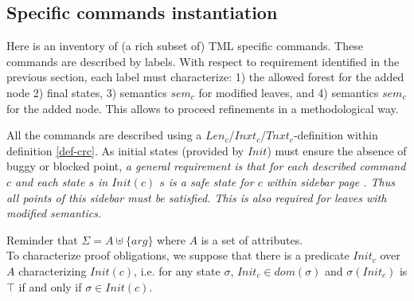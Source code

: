 \documentclass{article}
\begin{document}
\subsection{Specific commands instantiation}
Here is an inventory of (a rich subset of) TML specific commands. These commands are described by labels. With respect to requirement identified in the previous section, each label must characterize: 1) the allowed forest for the added node 2) final states, 3) semantics $sem_c$ for modified leaves, and 4) semantics $sem_c$ for the added node. This allows to proceed refinements in a methodological way.

All the commands are described using a $Len_c$/$Inxt_c$/$T\!nxt_c$-definition within definition \ref{def-crc}. As initial states (provided by $Init$) must ensure the absence of buggy or blocked point, {\em a general requirement is that for each described command $c$ and each state $s$ in $Init(c)$ $s$ is a safe state for $c$ within sidebar page \pageref{safestates}. Thus all points of this sidebar must be satisfied. This is also required for leaves with modified semantics.}
\begin{center}
Reminder that $\Sigma= A\uplus\{arg\}$ where $A$ is a set of attributes.\\
To characterize proof obligations, we suppose that there is a predicate $Init_c$ over $A$ characterizing $Init(c)$, i.e.
for any state $\sigma$, $Init_c\in dom(\sigma)$ and $\sigma(Init_c)$ is $\top$ if and only if $\sigma\in Init(c)$.
\end{center}
\end{document}
